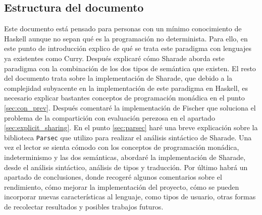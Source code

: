 \documentclass[class=article, crop=false]{standalone}
\begin{document}
\subsection{Estructura del documento}
Este documento está pensado para personas con un mínimo conocimiento de Haskell aunque no
sepan qué es la programación no determinista. Para ello, en este punto de introducción
explico de qué se trata este paradigma con lenguajes ya existentes como Curry. Después
explicaré cómo Sharade aborda este paradigma con la combinación de los dos tipos de semántica
que existen. El resto del documento trata sobre la implementación de Sharade, que debido a la
complejidad subyacente en la implementación de este paradigma en Haskell, es necesario
explicar bastantes conceptos de programación monádica en el punto \ref{sec:con_prev}. Después
comentaré la implementación de Fischer que soluciona el problema de la compartición con
evaluación perezosa en el apartado \ref{sec:explicit_sharing}.
En el punto \ref{sec:parsec} haré una breve explicación sobre la biblioteca \verb`Parsec` que
utilizo para realizar el análisis sintáctico de Sharade. Una vez el lector se sienta cómodo
con los conceptos de programación monádica, indeterminismo y las dos semánticas, abordaré la
implementación de Sharade, desde el análisis sintáctico, análisis de tipos y traducción. Por
último habrá un apartado de conclusiones, donde recogeré algunos comentarios sobre el 
rendimiento, cómo mejorar la implementación del proyecto, cómo se pueden incorporar nuevas
características al lenguaje, como tipos de usuario, otras formas de recolectar resultados y
posibles trabajos futuros.
\end{document}
